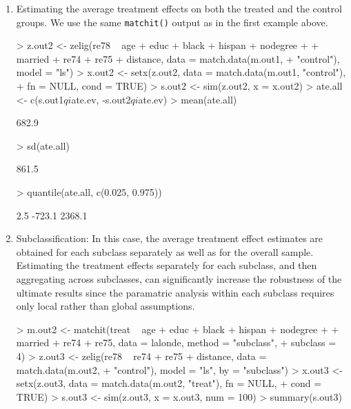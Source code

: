 \begin{enumerate}
\item Estimating the average treatment effects on both the treated and
  the control groups. We use the same {\tt matchit()} output as in the
  first example above.

\begin{Schunk}
\begin{Sinput}
> z.out2 <- zelig(re78 ~ age + educ + black + hispan + nodegree + 
+     married + re74 + re75 + distance, data = match.data(m.out1, 
+     "control"), model = "ls")
> x.out2 <- setx(z.out2, data = match.data(m.out1, "control"), 
+     fn = NULL, cond = TRUE)
> s.out2 <- sim(z.out2, x = x.out2)
> ate.all <- c(s.out1$qi$ate.ev, -s.out2$qi$ate.ev)
> mean(ate.all)
\end{Sinput}
\begin{Soutput}
[1] 682.9

\end{Soutput}
\begin{Sinput}
> sd(ate.all)
\end{Sinput}
\begin{Soutput}
[1] 861.5

\end{Soutput}
\begin{Sinput}
> quantile(ate.all, c(0.025, 0.975))
\end{Sinput}
\begin{Soutput}
  2.5%  97.5% 
-723.1 2368.1 

\end{Soutput}
\end{Schunk}
  
\item Subclassification: In this case, the average treatment effect
  estimates are obtained for each subclass separately as well as
  for the overall sample.  Estimating the treatment effects separately 
  for each subclass, and then aggregating across subclasses, can significantly
  increase the robustness of the ultimate results since the paramatric analysis
  within each subclass requires only local rather than global assumptions.

\begin{Schunk}
\begin{Sinput}
> m.out2 <- matchit(treat ~ age + educ + black + hispan + nodegree + 
+     married + re74 + re75, data = lalonde, method = "subclass", 
+     subclass = 4)
> z.out3 <- zelig(re78 ~ re74 + re75 + distance, data = match.data(m.out2, 
+     "control"), model = "ls", by = "subclass")
> x.out3 <- setx(z.out3, data = match.data(m.out2, "treat"), fn = NULL, 
+     cond = TRUE)
> s.out3 <- sim(z.out3, x = x.out3, num = 100)
> summary(s.out3)
\end{Sinput}
\begin{Soutput}


\end{Soutput}
\end{Schunk}
\end{enumerate}
